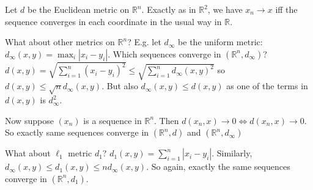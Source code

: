 \begin{example}
    Let $d$ be the Euclidean metric on $\mathbb{R}^n$.
    Exactly as in $\mathbb{R}^2$, we have $x_n \to x$ iff the sequence converges in each coordinate in the usual way in $\mathbb{R}$.

    What about other metrics on $\mathbb{R}^n$?
    E.g. let $d_\infty$ be the uniform metric: $d_\infty(x, y) = \max_i |x_i - y_i|$.
    Which sequences converge in $(\mathbb{R}^n, d_\infty)$?
    $d(x, y) = \sqrt{\sum_{i=1}^{n} (x_i - y_i)^2} \leq \sqrt{\sum_{i=1}^{n} d_\infty(x, y)^2}$ so $d(x,y) \leq \sqrt{n} d_\infty(x,y)$.
    But also $d_\infty(x, y) \leq d(x, y)$ as one of the terms in $d(x, y)$ is $d_\infty^2$.

    Now suppose $(x_n)$ is a sequence in $\mathbb{R}^n$.
    Then $d(x_n, x) \to 0 \iff d(x_n, x) \to 0$.
    So exactly same sequences converge in $(\mathbb{R}^n, d)$ and $(\mathbb{R}^n, d_\infty)$

    What about $\ell_1$ metric $d_1$?
    $d_1(x, y) = \sum_{i=1}^{n} |x_i - y_i|$.
    Similarly, $d_\infty(x, y) \leq d_1(x, y) \leq n d_\infty(x, y)$.
    So again, exactly the same sequences converge in $(\mathbb{R}^n, d_1)$.
\end{example} 

